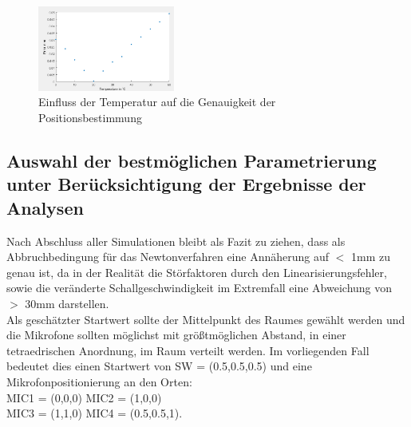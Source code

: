 \begin{figure}
\centering 
\includegraphics[width=0.4\textwidth]{Chart Temperatur}
\caption{Einfluss der Temperatur auf die Genauigkeit der Positionsbestimmung}\label{fig:Einfluss der Temperatur auf die Genauigkeit der Positionsbestimmung}
\end{figure}
\subsection{Auswahl der bestmöglichen Parametrierung unter Berücksichtigung der Ergebnisse der Analysen}
Nach Abschluss aller Simulationen bleibt als Fazit zu ziehen, dass als Abbruchbedingung für das Newtonverfahren eine Annäherung auf $<$ 1mm zu genau ist, da in der Realität die Störfaktoren durch den Linearisierungsfehler, sowie die veränderte Schallgeschwindigkeit im Extremfall eine Abweichung von $>$ 30mm darstellen.\\
Als geschätzter Startwert sollte der Mittelpunkt des Raumes gewählt werden und die Mikrofone sollten möglichst mit größtmöglichen Abstand, in einer tetraedrischen Anordnung, im Raum verteilt werden. Im vorliegenden Fall bedeutet dies einen Startwert von SW = (0.5,0.5,0.5) und eine Mikrofonpositionierung an den Orten: \\
MIC1 = (0,0,0)
MIC2 = (1,0,0)\\
MIC3 = (1,1,0)
MIC4 = (0.5,0.5,1).